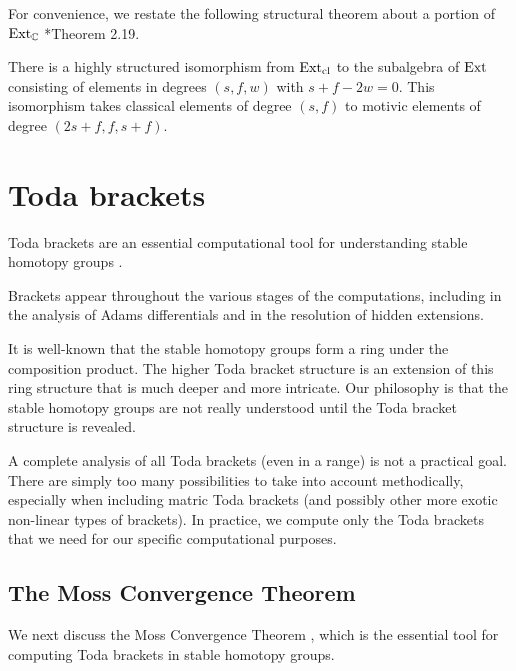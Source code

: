 For convenience, we restate the following structural theorem
about a portion of $\operatorname{Ext}_{\mathbb{C}}$  \cite{Isaksen14c}*{Theorem 2.19}.

\begin{thm}
\label{thm:Chow-zero}
There is a highly structured isomorphism from 
$\operatorname{Ext}_{\mathrm{cl}}$ to the subalgebra of $\operatorname{Ext}$ consisting of elements in degrees 
$(s, f, w)$ with $s + f - 2w = 0$. 
This isomorphism takes classical elements of degree $(s,f)$ 
to motivic elements of degree $(2s+f,f,s+f)$.
\end{thm}

\section{Toda brackets}

Toda brackets are an essential computational tool for understanding
stable homotopy groups 
.

Brackets appear throughout the various
stages of the computations, including in the analysis of Adams
differentials and in the resolution of hidden extensions.

It is well-known that the stable homotopy groups form a ring under
the composition product.  The higher Toda bracket structure is an
extension of this ring structure that is much deeper and more intricate.
Our philosophy is that the stable homotopy groups are not really
understood until the Toda bracket structure is revealed.

A complete analysis of all Toda brackets (even in a range)
is not a practical goal.  There are simply too many possibilities
to take into account methodically, especially when including
matric Toda brackets
(and possibly other more exotic non-linear types of brackets).
In practice, we compute only the Toda brackets that we need
for our specific computational purposes.


\subsection{The Moss Convergence Theorem}
\label{subsctn:Moss}

We next discuss the Moss Convergence Theorem \cite{Moss70}, which is
the essential tool for computing Toda brackets in stable homotopy
groups.  

